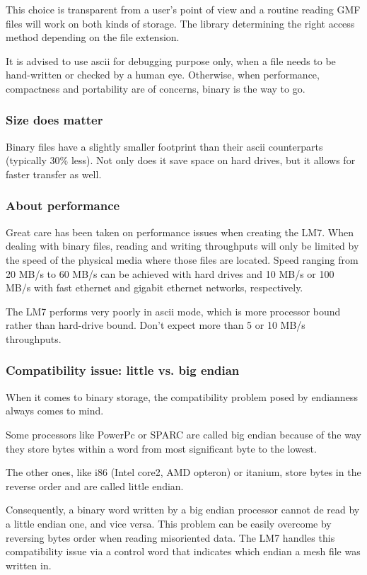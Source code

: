 \documentclass[a4paper,12pt]{article}
\begin{document}
This choice is transparent from a user's point of view and a routine reading GMF files will work on both kinds of storage.
The library determining the right access method depending on the file extension.

It is advised to use ascii for debugging purpose only, when a file needs to be hand-written or checked by a human eye. Otherwise, when performance, compactness and portability are of concerns, binary is the way to go.


\subsubsection{Size does matter}
Binary files have a slightly smaller footprint than their ascii counterparts (typically 30\% less). Not only does it save space on hard drives, but it allows for faster transfer as well.


\subsubsection{About performance}
Great care has been taken on performance issues when creating the LM7. When dealing with binary files, reading and writing throughputs will only be limited by the speed of the physical media where those files are located. Speed ranging from 20 MB/s to 60 MB/s can be achieved with hard drives and 10 MB/s or 100 MB/s with fast ethernet and gigabit ethernet networks, respectively.

The LM7 performs very poorly in ascii mode, which is more processor bound rather than hard-drive bound. Don't expect more than 5 or 10 MB/s throughputs.

\subsubsection{Compatibility issue: little vs. big endian}
When it comes to binary storage, the compatibility problem posed by endianness always comes to mind.

Some processors like PowerPc or SPARC are called big endian because of the way they store bytes within a word from most significant byte to the lowest.

The other ones, like i86 (Intel core2, AMD opteron) or itanium, store bytes in the reverse order and are called little endian.

Consequently, a binary word written by a big endian processor cannot de read by a little endian one, and vice versa. This problem can be easily overcome by reversing bytes order when reading misoriented data. The LM7 handles this compatibility issue via a control word that indicates which endian a mesh file was written in.
\end{document}
